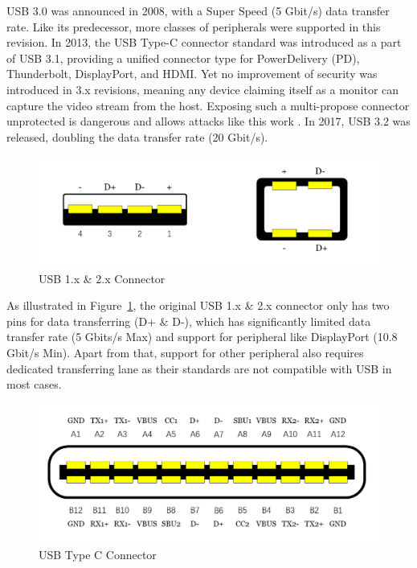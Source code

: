 USB 3.0\cite{usb30} was announced in 2008, with a Super Speed (5 Gbit/s) data
transfer rate. Like its predecessor, more classes of peripherals were supported
in this revision. In 2013, the USB Type-C connector standard was introduced as a
part of USB 3.1\cite{usb31}, providing a unified connector type for
PowerDelivery (PD), Thunderbolt, DisplayPort, and HDMI.  Yet no improvement of
security was introduced in 3.x revisions, meaning any device claiming
itself as a monitor can capture the video stream from the host. Exposing
such a multi-propose connector unprotected is dangerous and allows attacks like
this work \tool. In 2017, USB 3.2\cite{usb32} was released, doubling the data
transfer rate (20 Gbit/s).

\begin{figure}[t]
    \centering
	\includegraphics[width=0.7\linewidth]{./Figs/usb_conn.png}
	\caption{USB 1.x \& 2.x Connector}
	\label{fig:usb_conn}
\end{figure}

As illustrated in Figure~\ref{fig:usb_conn}, the original USB 1.x \& 2.x
connector only has two pins for data transferring (D+ \& D-), which has
significantly limited data transfer rate (5 Gbits/s Max) and support for
peripheral like DisplayPort (10.8 Gbit/s Min). Apart from that, support for
other peripheral also requires dedicated transferring lane as their standards
are not compatible with USB in most cases.  \begin{figure}[t] \centering
\includegraphics[width=\linewidth]{./Figs/usb_c_conn.png} \caption{USB Type C
Connector} \label{fig:usb_c_conn} \end{figure}

